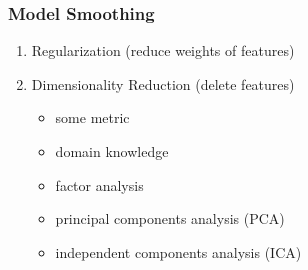 \begin{frame}
  \frametitle{Model Smoothing}
  \begin{enumerate}
    \item Regularization (reduce weights of features)
    \item Dimensionality Reduction (delete features)
    \begin{itemize}
      \item {} some metric
      \item {} domain knowledge
      \item {} factor analysis
      \item {} principal components analysis (PCA)
      \item {} independent components analysis (ICA)
    \end{itemize}
  \end{enumerate}
\end{frame}
